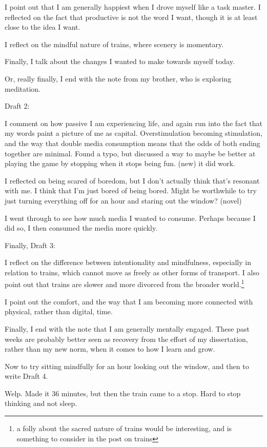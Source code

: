 \documentclass[12pt]{article}
\renewcommand{\,}{\textsuperscript{,}}
\begin{document}
I point out that I am generally happiest when I drove myself like a task master.
I reflected on the fact that productive is not the word I want, though it is at least close to the idea I want.

I reflect on the mindful nature of trains, where scenery is momentary.

Finally, I talk about the changes I wanted to make towards myself today.

Or, really finally, I end with the note from my brother, who is exploring meditation.

Draft 2:

I comment on how passive I am experiencing life, and again run into the fact that my words paint a picture of me as capital.
Overstimulation becoming stimulation, and the way that double media consumption means that the odds of both ending together are minimal.
Found a typo, but discussed a way to maybe be better at playing the game by stopping when it stops being fun.
(new) it did work.

I reflected on being scared of boredom, but I don't actually think that's resonant with me.
I think that I'm just bored of being bored.
Might be worthwhile to try just turning everything off for an hour and staring out the window? (novel)

I went through to see how much media I wanted to consume.
Perhaps because I did so, I then consumed the media more quickly.

Finally, Draft 3:

I reflect on the difference between intentionality and mindfulness, especially in relation to trains, which cannot move as freely as other forms of transport.
I also point out that trains are slower and more divorced from the broader world.\footnote{a folly about the sacred nature of trains would be interesting, and is something to consider in the post on trains}

I point out the comfort, and the way that I am becoming more connected with physical, rather than digital, time.

Finally, I end with the note that I am generally mentally engaged. 
These past weeks are probably better seen as recovery from the effort of my dissertation, rather than my new norm, when it comes to how I learn and grow.

Now to try sitting mindfully for an hour looking out the window, and then to write Draft 4.

Welp. Made it 36 minutes, but then the train came to a stop. Hard to stop thinking and not sleep.
\end{document}

